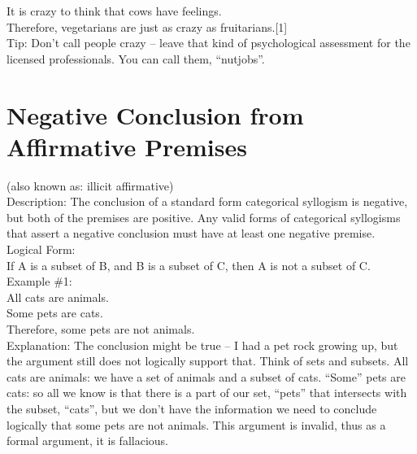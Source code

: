 \documentclass[a4paper,12pt,single,pdftex]{scrartcl}
\begin{document}
    
      It is crazy to think that cows have feelings.
    \\

    
      Therefore, vegetarians are just as crazy as fruitarians.[1]
    \\

    
      Tip: Don’t call people crazy -- leave that kind of psychological assessment for the licensed professionals.  You can call them, “nutjobs”.
    \\

    \section{
      Negative Conclusion from Affirmative Premises
    }
  
    

    
      
        (also known as: illicit affirmative)
      \\

      
        Description: The conclusion of a standard form categorical syllogism is negative, but both of the premises are positive.  Any valid forms of categorical syllogisms that assert a negative conclusion must have at least one negative premise.
      \\

      
        Logical Form:
      \\

      
        If A is a subset of B, and B is a subset of C, then A is not a subset of C.
      \\

      
        Example \#1:
      \\

      
        All cats are animals.
      \\

      
        Some pets are cats.
      \\

      
        Therefore, some pets are not animals.
      \\

      
        Explanation: The conclusion might be true -- I had a pet rock growing up, but the argument still does not logically support that.  Think of sets and subsets.  All cats are animals: we have a set of animals and a subset of cats.  “Some” pets are cats: so all we know is that there is a part of our set, “pets” that intersects with the subset, “cats”, but we don’t have the information we need to conclude logically that some pets are not animals.  This argument is invalid, thus as a formal argument, it is fallacious.
      \\
\end{document}
